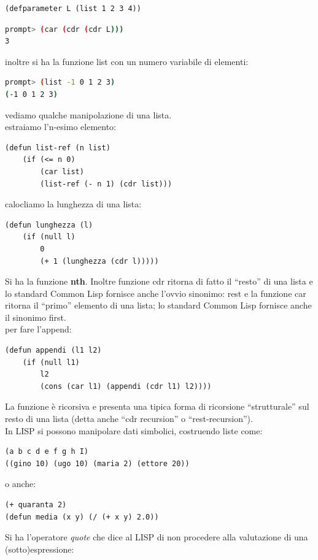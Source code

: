 \documentclass[a4paper,12pt, oneside]{book}
\begin{document}
\begin{verbatim}
(defparameter L (list 1 2 3 4))
\end{verbatim}
\begin{shaded}
\begin{lstlisting}[language=bash]
prompt> (car (cdr (cdr L)))
3
\end{lstlisting}
\end{shaded}
inoltre si ha la funzione list con un numero variabile di elementi:
\begin{shaded}
\begin{lstlisting}[language=bash]
prompt> (list -1 0 1 2 3)
(-1 0 1 2 3)
\end{lstlisting}
\end{shaded}
vediamo qualche manipolazione di una lista.\\
estraiamo l'n-esimo elemento:
\begin{verbatim}
(defun list-ref (n list)
    (if (<= n 0)
        (car list)
        (list-ref (- n 1) (cdr list)))
\end{verbatim}
calocliamo la lunghezza di una lista:
\begin{verbatim}
(defun lunghezza (l)
    (if (null l)
        0
        (+ 1 (lunghezza (cdr l)))))
\end{verbatim}
Si ha la funzione \textbf{nth}. Inoltre funzione cdr ritorna di fatto il “resto” di una lista e lo standard
Common Lisp fornisce anche l’ovvio sinonimo: rest e la funzione car ritorna il “primo” elemento di una lista; lo standard
Common Lisp fornisce anche il sinonimo first.\\
per fare l'append:
\begin{verbatim}
(defun appendi (l1 l2)
    (if (null l1)
        l2
        (cons (car l1) (appendi (cdr l1) l2))))
\end{verbatim}
La funzione è ricorsiva e presenta una tipica forma di ricorsione “strutturale” sul resto di una lista (detta anche “cdr recursion” o “rest-recursion”).\\
In LISP si possono manipolare dati simbolici, costruendo liste come:
\begin{verbatim}
(a b c d e f g h I)
((gino 10) (ugo 10) (maria 2) (ettore 20))
\end{verbatim}
o anche:
\begin{verbatim}
(+ quaranta 2)
(defun media (x y) (/ (+ x y) 2.0))
\end{verbatim}
Si ha l'operatore \textit{quote} che dice al LISP di non procedere alla valutazione di una (sotto)espressione:
\end{document}
